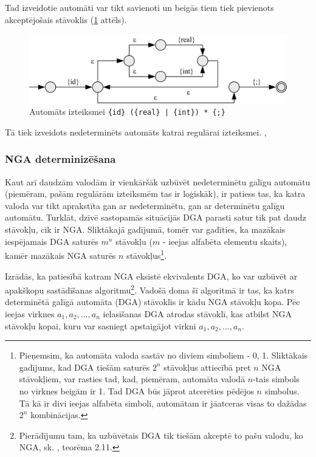 Tad izveidotie automāti var tikt savienoti un beigās tiem tiek pievienots akceptējošais stāvoklis (\ref{fig:auto_full_ex} attēls).

\begin{figure}[H]
  \centering
    \includegraphics[scale=1.25]{pictures/auto_full_ex}
  \caption{\label{fig:auto_full_ex}Automāts izteiksmei \texttt{\{id\} (\{real\} | \{int\}) * \{;\}}}
\end{figure}

Tā tiek izveidots nedeterminēts automāts katrai regulārai izteiksmei. \cite{Cox:RegexpMatchingFast}, \cite{DragonBook}

\subsubsection{NGA determinizēšana}

Kaut arī daudzām valodām ir vienkāršāk uzbūvēt nedeterminētu galīgu automātu (piemēram, pašām regulārām izteiksmēm tas ir loģiskāk), ir patiess tas, ka katra valoda var tikt aprakstīta gan ar nedeterminētu, gan ar determinētu galīgu automātu. Turklāt, dzīvē sastopamās situācijās DGA parasti satur tik pat daudz stāvokļu, cik ir NGA. Sliktākajā gadījumā, tomēr var gadīties, ka mazākais iespējamais DGA saturēs $m^n$ stāvokļu ($m$ - ieejas alfabēta elementu skaits), kamēr mazākais NGA saturēs $n$ stāvokļus\footnote{Pieņemsim, ka automāta valoda sastāv no diviem simboliem - {0, 1}. Sliktākais gadījums, kad DGA tiešām saturēs $2^n$ stāvokļus attiecībā pret $n$ NGA stāvokļiem, var rasties tad, kad, piemēram, automāta valodā $n$-tais simbols no virknes beigām ir 1. Tad DGA būs jāprot atcerēties pēdējos $n$ simbolus. Tā kā ir divi ieejas alfabēta simboli, automātam ir jāatceras visas to dažādas $2^n$ kombinācijas.}.

Izrādās, ka patiesībā katram NGA eksistē ekvivalents DGA, ko var uzbūvēt ar apakškopu sastādīšanas algoritmu\footnote{Pierādījumu tam, ka uzbūvētais DGA tik tiešām akceptē to pašu valodu, ko NGA, sk.  \cite{Hopcroft:IntroAutomataTheory}, teorēma 2.11.}. Vadošā doma šī algoritmā ir tas, ka katrs determinētā galīgā automāta (DGA) stāvoklis ir kādu NGA stāvokļu kopa. Pēc ieejas virknes $a_1, a_2, ..., a_n$ ielasīšanas DGA atrodas stāvoklī, kas atbilst NGA stāvokļu kopai, kuru var sasniegt apstaigājot virkni $a_1, a_2, ..., a_n$.

